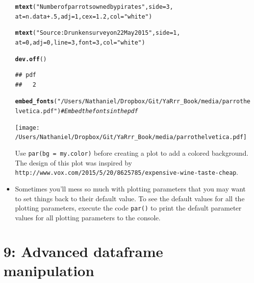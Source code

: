 \documentclass{tufte-book}\usepackage[]{graphicx}\usepackage[]{color}
\makeatletter
\newcommand{\hlnum}[1]{\textcolor[rgb]{0.686,0.059,0.569}{#1}}%
\newcommand{\hlstr}[1]{\textcolor[rgb]{0.192,0.494,0.8}{#1}}%
\newcommand{\hlcom}[1]{\textcolor[rgb]{0.678,0.584,0.686}{\textit{#1}}}%
\newcommand{\hlopt}[1]{\textcolor[rgb]{0,0,0}{#1}}%
\newcommand{\hlstd}[1]{\textcolor[rgb]{0.345,0.345,0.345}{#1}}%
\newcommand{\hlkwc}[1]{\textcolor[rgb]{0.333,0.667,0.333}{#1}}%
\newcommand{\hlkwd}[1]{\textcolor[rgb]{0.737,0.353,0.396}{\textbf{#1}}}%
\newenvironment{kframe}{%
 \def\at@end@of@kframe{}%
 \ifinner\ifhmode%
  \def\at@end@of@kframe{\end{minipage}}%
  \begin{minipage}{\columnwidth}%
 \fi\fi%
 \def\FrameCommand##1{\hskip\@totalleftmargin \hskip-\fboxsep
 \colorbox{shadecolor}{##1}\hskip-\fboxsep
     \hskip-\linewidth \hskip-\@totalleftmargin \hskip\columnwidth}%
 \MakeFramed {\advance\hsize-\width
   \@totalleftmargin\z@ \linewidth\hsize
   \@setminipage}}%
 {\par\unskip\endMakeFramed%
 \at@end@of@kframe}
\newenvironment{knitrout}{}{} %
\makeatother
\begin{document}
\begin{footnotesize}
\begin{itemize}
\begin{marginfigure}
\begin{tiny}
\begin{knitrout}
\begin{kframe}
\begin{alltt}
\hlkwd{mtext}\hlstd{(}\hlstr{"Number of parrots owned by pirates"}\hlstd{,} \hlkwc{side} \hlstd{=} \hlnum{3}\hlstd{,}
      \hlkwc{at} \hlstd{= n.data} \hlopt{+} \hlnum{.5}\hlstd{,} \hlkwc{adj} \hlstd{=} \hlnum{1}\hlstd{,} \hlkwc{cex} \hlstd{=} \hlnum{1.2}\hlstd{,} \hlkwc{col} \hlstd{=} \hlstr{"white"}\hlstd{)}

\hlkwd{mtext}\hlstd{(}\hlstr{"Source: Drunken survey on 22 May 2015"}\hlstd{,} \hlkwc{side} \hlstd{=} \hlnum{1}\hlstd{,}
      \hlkwc{at} \hlstd{=} \hlnum{0}\hlstd{,} \hlkwc{adj} \hlstd{=} \hlnum{0}\hlstd{,} \hlkwc{line} \hlstd{=} \hlnum{3}\hlstd{,} \hlkwc{font} \hlstd{=} \hlnum{3}\hlstd{,} \hlkwc{col} \hlstd{=} \hlstr{"white"}\hlstd{)}

\hlkwd{dev.off}\hlstd{()}
\end{alltt}
\begin{verbatim}
## pdf 
##   2
\end{verbatim}
\begin{alltt}
\hlkwd{embed_fonts}\hlstd{(}\hlstr{"/Users/Nathaniel/Dropbox/Git/YaRrr_Book/media/parrothelvetica.pdf"}\hlstd{)} \hlcom{# Embed the fonts in the pdf}
\end{alltt}
\end{kframe}
\end{knitrout}
\end{tiny}
\texttt{[image: /Users/Nathaniel/Dropbox/Git/YaRrr\_Book/media/parrothelvetica.pdf]}
\caption{Use \texttt{par(bg = my.color)} before creating a plot to add a colored background. The design of this plot was inspired by \texttt{http://www.vox.com/2015/5/20/8625785/expensive-wine-taste-cheap}.}
\label{fig:coloredbackground}
\end{marginfigure}


\item Sometimes you'll mess so much with plotting parameters that you may want to set things back to their default value. To see the default values for all the plotting parameters, execute the code \texttt{par()} to print the default parameter values for all plotting parameters to the console.



\end{itemize}



\chapter{9: Advanced dataframe manipulation}
\label{ch:9}



\end{footnotesize}
\end{document}
